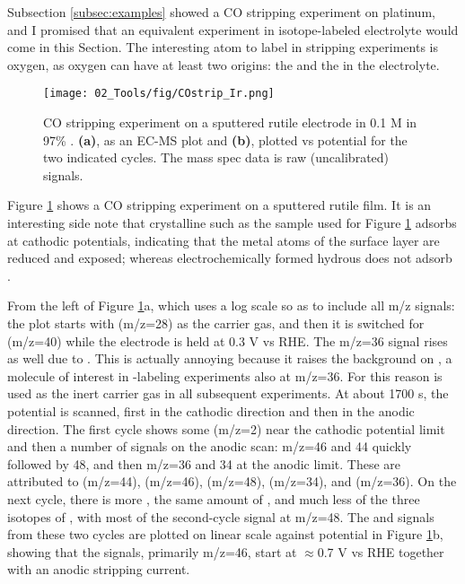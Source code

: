 Subsection \ref{subsec:examples} showed a CO stripping experiment on platinum, and I promised that an equivalent experiment in isotope-labeled electrolyte would come in this Section. The interesting atom to label in  stripping experiments is oxygen, as oxygen can have at least two origins: the  and the  in the electrolyte.

\begin{figure}[t]
	\centering
	\texttt{[image: 02\_Tools/fig/COstrip\_Ir.png]}
	\caption{CO stripping experiment on a sputtered rutile  electrode in 0.1 M  in 97\% . \textbf{(a)}, as an EC-MS plot and \textbf{(b)}, plotted vs potential for the two indicated cycles. The mass spec data is raw (uncalibrated) signals.}
	\label{fig:IrO2_COstrip}
\end{figure}

Figure \ref{fig:IrO2_COstrip} shows a CO stripping experiment on a sputtered rutile  film. It is an interesting side note that crystalline  such as the sample used for Figure \ref{fig:IrO2_COstrip} adsorbs  at cathodic potentials, indicating that the metal atoms of the surface layer are reduced and exposed; whereas electrochemically formed hydrous  does not adsorb . 

From the left of Figure \ref{fig:IrO2_COstrip}a, which uses a log scale so as to include all m/z signals: the plot starts with  (m/z=28) as the carrier gas, and then it is switched for  (m/z=40) while the electrode is held at 0.3 V vs RHE. The m/z=36 signal rises as well due to . This is actually annoying because it raises the background on , a molecule of interest in -labeling experiments also at m/z=36. For this reason  is used as the inert carrier gas in all subsequent  experiments. At about 1700 s, the potential is scanned, first in the cathodic direction and then in the anodic direction. The first cycle shows some  (m/z=2) near the cathodic potential limit and then a number of signals on the anodic scan: m/z=46 and 44 quickly followed by 48, and then m/z=36 and 34 at the anodic limit. These are attributed to  (m/z=44),  (m/z=46),  (m/z=48),  (m/z=34), and  (m/z=36). On the next cycle, there is more , the same amount of , and much less of the three isotopes of , with most of the second-cycle  signal at m/z=48. The  and  signals from these two cycles are plotted on linear scale against potential in Figure \ref{fig:IrO2_COstrip}b, showing that the  signals, primarily m/z=46, start at $\approx$0.7 V vs RHE together with an anodic stripping current. 
	
